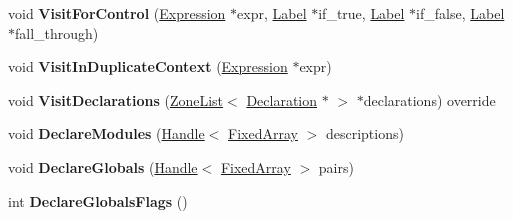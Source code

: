 \begin{DoxyCompactItemize}
\item 
void {\bfseries Visit\+For\+Control} (\hyperlink{classv8_1_1internal_1_1_expression}{Expression} $\ast$expr, \hyperlink{classv8_1_1internal_1_1_label}{Label} $\ast$if\+\_\+true, \hyperlink{classv8_1_1internal_1_1_label}{Label} $\ast$if\+\_\+false, \hyperlink{classv8_1_1internal_1_1_label}{Label} $\ast$fall\+\_\+through)\hypertarget{classv8_1_1internal_1_1_full_code_generator_a2c0fcae84d1a2cb9e6e91b7f3d6fda95}{}\label{classv8_1_1internal_1_1_full_code_generator_a2c0fcae84d1a2cb9e6e91b7f3d6fda95}

\item 
void {\bfseries Visit\+In\+Duplicate\+Context} (\hyperlink{classv8_1_1internal_1_1_expression}{Expression} $\ast$expr)\hypertarget{classv8_1_1internal_1_1_full_code_generator_affd736282add4cc2cfd330d5094df204}{}\label{classv8_1_1internal_1_1_full_code_generator_affd736282add4cc2cfd330d5094df204}

\item 
void {\bfseries Visit\+Declarations} (\hyperlink{classv8_1_1internal_1_1_zone_list}{Zone\+List}$<$ \hyperlink{classv8_1_1internal_1_1_declaration}{Declaration} $\ast$ $>$ $\ast$declarations) override\hypertarget{classv8_1_1internal_1_1_full_code_generator_a397644cc96e3788621250d00f6d953a8}{}\label{classv8_1_1internal_1_1_full_code_generator_a397644cc96e3788621250d00f6d953a8}

\item 
void {\bfseries Declare\+Modules} (\hyperlink{classv8_1_1internal_1_1_handle}{Handle}$<$ \hyperlink{classv8_1_1internal_1_1_fixed_array}{Fixed\+Array} $>$ descriptions)\hypertarget{classv8_1_1internal_1_1_full_code_generator_a937b015097e8cc675bb92c5feb3c5389}{}\label{classv8_1_1internal_1_1_full_code_generator_a937b015097e8cc675bb92c5feb3c5389}

\item 
void {\bfseries Declare\+Globals} (\hyperlink{classv8_1_1internal_1_1_handle}{Handle}$<$ \hyperlink{classv8_1_1internal_1_1_fixed_array}{Fixed\+Array} $>$ pairs)\hypertarget{classv8_1_1internal_1_1_full_code_generator_a3fd932d58fb079259305c04fd40f53e6}{}\label{classv8_1_1internal_1_1_full_code_generator_a3fd932d58fb079259305c04fd40f53e6}

\item 
int {\bfseries Declare\+Globals\+Flags} ()\hypertarget{classv8_1_1internal_1_1_full_code_generator_aa09d8bd8c9f135bf923299fc029302d8}{}\label{classv8_1_1internal_1_1_full_code_generator_aa09d8bd8c9f135bf923299fc029302d8}


\end{DoxyCompactItemize}
